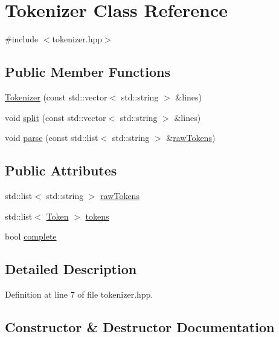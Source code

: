 \hypertarget{class_tokenizer}{}\section{Tokenizer Class Reference}
\label{class_tokenizer}


{\ttfamily \#include $<$tokenizer.\+hpp$>$}

\subsection*{Public Member Functions}
\begin{DoxyCompactItemize}
\item 
\hyperlink{class_tokenizer_a6edc9ba4af94d2aa55f48a83c903800f}{Tokenizer} (const std\+::vector$<$ std\+::string $>$ \&lines)
\item 
void \hyperlink{class_tokenizer_a8bd8a4eb5df764f6128028daa0e9044b}{split} (const std\+::vector$<$ std\+::string $>$ \&lines)
\item 
void \hyperlink{class_tokenizer_ae928efe72c00908a3529747b4cfd01d5}{parse} (const std\+::list$<$ std\+::string $>$ \&\hyperlink{class_tokenizer_a89707ad3a758fc9ec58f00d92d5fc622}{raw\+Tokens})
\end{DoxyCompactItemize}
\subsection*{Public Attributes}
\begin{DoxyCompactItemize}
\item 
std\+::list$<$ std\+::string $>$ \hyperlink{class_tokenizer_a89707ad3a758fc9ec58f00d92d5fc622}{raw\+Tokens}
\item 
std\+::list$<$ \hyperlink{struct_token}{Token} $>$ \hyperlink{class_tokenizer_ae547093dbd03b3e70373147e4669d9fa}{tokens}
\item 
bool \hyperlink{class_tokenizer_a330a4cce0cbf3ebfbe601d97022d1ed4}{complete}
\end{DoxyCompactItemize}


\subsection{Detailed Description}


Definition at line 7 of file tokenizer.\+hpp.



\subsection{Constructor \& Destructor Documentation}
\hypertarget{class_tokenizer_a6edc9ba4af94d2aa55f48a83c903800f}{}
